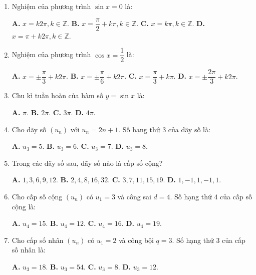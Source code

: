 \documentclass[12pt, a4paper]{article}
\begin{document}
\begin{enumerate}[leftmargin=1.5em]
    \item Nghiệm của phương trình $\sin x = 0$ là:
    \begin{center}
    \textbf{A.} $x = k2\pi, k \in \mathbb{Z}$. \qquad \textbf{B.} $x = \dfrac{\pi}{2} + k\pi, k \in \mathbb{Z}$. \qquad \textbf{C.} $x = k\pi, k \in \mathbb{Z}$. \qquad \textbf{D.} $x = \pi + k2\pi, k \in \mathbb{Z}$.
    \end{center}

    \item Nghiệm của phương trình $\cos x = \dfrac{1}{2}$ là:
    \begin{center}
    \textbf{A.} $x = \pm \dfrac{\pi}{3} + k2\pi$. \qquad \textbf{B.} $x = \pm \dfrac{\pi}{6} + k2\pi$. \qquad \textbf{C.} $x = \dfrac{\pi}{3} + k\pi$. \qquad \textbf{D.} $x = \pm \dfrac{2\pi}{3} + k2\pi$.
    \end{center}

    \item Chu kì tuần hoàn của hàm số $y = \sin x$ là:
    \begin{center}
    \textbf{A.} $\pi$. \qquad \textbf{B.} $2\pi$. \qquad \textbf{C.} $3\pi$. \qquad \textbf{D.} $4\pi$.
    \end{center}

    \item Cho dãy số $(u_n)$ với $u_n = 2n + 1$. Số hạng thứ $3$ của dãy số là:
    \begin{center}
    \textbf{A.} $u_3 = 5$. \qquad \textbf{B.} $u_3 = 6$. \qquad \textbf{C.} $u_3 = 7$. \qquad \textbf{D.} $u_3 = 8$.
    \end{center}

    \item Trong các dãy số sau, dãy số nào là cấp số cộng?
    \begin{center}
    \textbf{A.} $1, 3, 6, 9, 12$. \qquad \textbf{B.} $2, 4, 8, 16, 32$. \qquad \textbf{C.} $3, 7, 11, 15, 19$. \qquad \textbf{D.} $1, -1, 1, -1, 1$.
    \end{center}

    \item Cho cấp số cộng $(u_n)$ có $u_1 = 3$ và công sai $d = 4$. Số hạng thứ $4$ của cấp số cộng là:
    \begin{center}
    \textbf{A.} $u_4 = 15$. \qquad \textbf{B.} $u_4 = 12$. \qquad \textbf{C.} $u_4 = 16$. \qquad \textbf{D.} $u_4 = 19$.
    \end{center}

    \item Cho cấp số nhân $(u_n)$ có $u_1 = 2$ và công bội $q = 3$. Số hạng thứ $3$ của cấp số nhân là:
    \begin{center}
    \textbf{A.} $u_3 = 18$. \qquad \textbf{B.} $u_3 = 54$. \qquad \textbf{C.} $u_3 = 8$. \qquad \textbf{D.} $u_3 = 12$.
    \end{center}


\end{enumerate}
\end{document}
